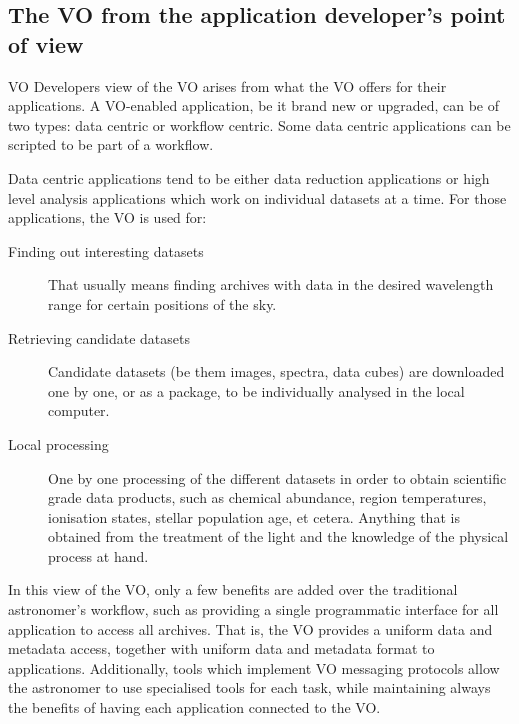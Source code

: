 	\subsection{The VO from the application developer's point of view}
	\label{ssub:the_vo_for_the_application_developer}

		VO Developers view of the VO arises from what the VO offers
		for their applications. A VO-enabled application, be it
		brand new or upgraded, can be of two types: data centric or
		workflow centric. Some data centric applications can be
		scripted to be part of a workflow.
		
		 Data centric applications tend to be either data reduction
		applications or high level analysis applications which work
		on individual datasets at a time. For those applications,
		the VO is used for:
		
		\begin{description}
		
			\item[Finding out interesting datasets] That usually
		    means finding archives with data in the desired
		    wavelength range for certain positions of the sky.
			
			 \item[Retrieving candidate datasets] Candidate
		    datasets
			(be them images, spectra, data cubes)
			are downloaded
		    one by one, or as a package, to be individually
		    analysed in the local computer.
			
			 \item[Local processing] One by one processing of the
		    different datasets in order to obtain scientific grade
		    data products, such as chemical abundance, region
		    temperatures, ionisation states, stellar population
		    age, et cetera. Anything that is obtained from the
		    treatment of the light and the knowledge of the
		    physical process at hand.
		
		\end{description}

		 In this view of the VO, only a few benefits are added over
		the traditional astronomer's workflow, such as providing a
		single programmatic interface for all application to access
		all archives. That is, the VO provides a uniform data and
		metadata access, together with uniform data and metadata
		format to applications. Additionally, tools which implement
		VO messaging protocols allow the astronomer to use
		specialised tools for each task, while maintaining always
		the benefits of having each application connected to the
		VO.
		
